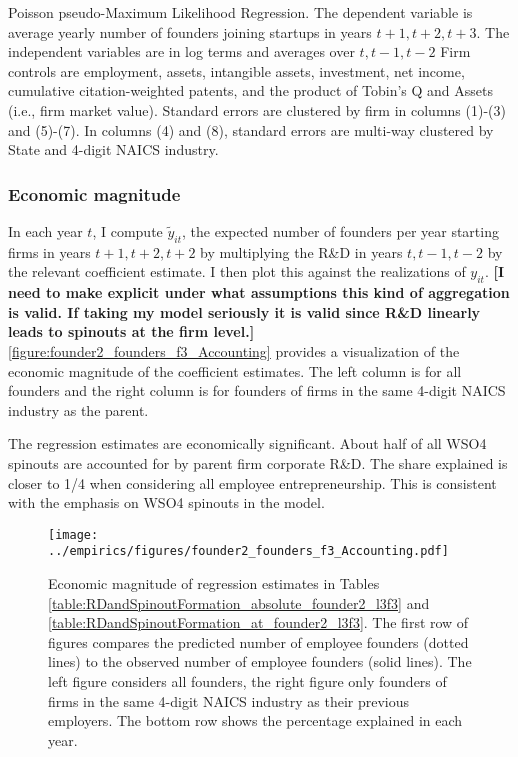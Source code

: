 \documentclass[11pt,english]{article}
\begin{document}
\begin{table}[!htb]
	\scriptsize
	\centering
	
	\caption{Poisson pseudo-Maximum Likelihood Regression. The dependent variable is average yearly number of founders joining startups in years $t+1,t+2,t+3$. The independent variables are in log terms and averages over $t,t-1,t-2$ Firm controls are employment, assets, intangible assets, investment, net income, cumulative citation-weighted patents, and the product of Tobin's Q and Assets (i.e., firm market value). Standard errors are clustered by firm in columns (1)-(3) and (5)-(7). In columns (4) and (8), standard errors are multi-way clustered by State and 4-digit NAICS industry.}
	\label{table:RDandSpinoutFormation_ppml_absolute_founder2_l3f3}
\end{table}

\subsubsection{Economic magnitude}

In each year $t$, I compute $\tilde{y}_{it}$, the expected number of founders per year starting firms in years $t+1,t+2,t+2$ by multiplying the R\&D in years $t,t-1,t-2$ by the relevant coefficient estimate. I then plot this against the realizations of $y_{it}$. \textbf{[I need to make explicit under what assumptions this kind of aggregation is valid. If taking my model seriously it is valid since R\&D linearly leads to spinouts at the firm level.]} \autoref{figure:founder2_founders_f3_Accounting} provides a visualization of the economic magnitude of the coefficient estimates. The left column is for all founders and the right column is for founders of firms in the same 4-digit NAICS industry as the parent. 

The regression estimates are economically significant. About half of all WSO4 spinouts are accounted for by parent firm corporate R\&D. The share explained is closer to 1/4 when considering all employee entrepreneurship. This is consistent with the emphasis on WSO4 spinouts in the model. 

\begin{figure}[!htb]
	\texttt{[image: ../empirics/figures/founder2\_founders\_f3\_Accounting.pdf]}
	\caption{Economic magnitude of regression estimates in Tables \ref{table:RDandSpinoutFormation_absolute_founder2_l3f3} and \ref{table:RDandSpinoutFormation_at_founder2_l3f3}. The first row of figures compares the predicted number of employee founders (dotted lines) to the observed number of employee founders (solid lines). The left figure considers all founders, the right figure only founders of firms in the same 4-digit NAICS industry as their previous employers. The bottom row shows the percentage explained in each year.}
	\label{figure:founder2_founders_f3_Accounting}
\end{figure}
\end{document}
